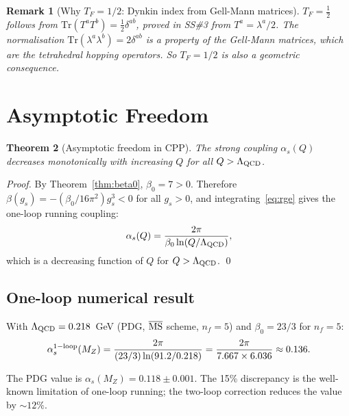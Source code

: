 \documentclass[11pt,a4paper]{article}
\newtheorem{theorem}{Theorem}[section]
\newtheorem{remark}[theorem]{Remark}
\newcommand{\as}{\alpha_s}
\begin{document}
\begin{remark}[Why $T_F = 1/2$: Dynkin index from Gell-Mann matrices]
$T_F = \frac{1}{2}$ follows from
$\mathrm{Tr}(T^a T^b) = \frac{1}{2}\delta^{ab}$, proved in SS\#3
from $T^a = \lambda^a/2$.  The normalisation $\mathrm{Tr}(\lambda^a
\lambda^b) = 2\delta^{ab}$ is a property of the Gell-Mann matrices,
which are the tetrahedral hopping operators.  So $T_F = 1/2$ is
also a geometric consequence.
\end{remark}

\section{Asymptotic Freedom}
\label{sec:af}

\begin{theorem}[Asymptotic freedom in CPP]
\label{thm:af}
The strong coupling $\as(Q)$ decreases monotonically with
increasing $Q$ for all $Q > \Lambda_{\rm QCD}$.
\end{theorem}

\begin{proof}
By Theorem~\ref{thm:beta0}, $\beta_0 = 7 > 0$.
Therefore $\beta(g_s) = -(\beta_0/16\pi^2)g_s^3 < 0$
for all $g_s > 0$, and integrating~\eqref{eq:rge} gives
the one-loop running coupling:
\begin{equation}
\as(Q) = \frac{2\pi}{\beta_0\ln(Q/\Lambda_{\rm QCD})},
\label{eq:running}
\end{equation}
which is a decreasing function of $Q$ for $Q > \Lambda_{\rm QCD}$.
\qed
\end{proof}

\subsection{One-loop numerical result}

With $\Lambda_{\rm QCD} = 0.218$~GeV (PDG, $\overline{\rm MS}$
scheme, $n_f = 5$) and $\beta_0 = 23/3$ for $n_f = 5$:
\begin{equation}
\as^{\rm 1-loop}(M_Z)
= \frac{2\pi}{(23/3)\ln(91.2/0.218)}
= \frac{2\pi}{7.667 \times 6.036}
\approx 0.136.
\label{eq:as_1loop}
\end{equation}

The PDG value is $\as(M_Z) = 0.118\pm0.001$.  The 15\%
discrepancy is the well-known limitation of one-loop running;
the two-loop correction reduces the value by $\sim12\%$.
\end{document}
